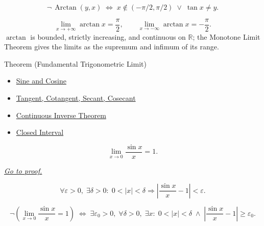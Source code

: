 \begin{remark*}
\[
  \neg\,\operatorname{Arctan}(y,x)
  \;\iff\;
  x\notin(-\pi/2,\pi/2) \;\vee\; \tan x \neq y.
\]
\end{remark*}

\begin{remark*}
\[
  \lim_{x \to +\infty} \arctan x = \frac{\pi}{2},
  \qquad
  \lim_{x \to -\infty} \arctan x = -\frac{\pi}{2}.
\]
$\arctan$ is bounded, strictly increasing, and continuous on
$\mathbb{R}$; the Monotone Limit Theorem gives the limits as the
supremum and infimum of its range.
\end{remark*}


\begin{theorembox}{Theorem (Fundamental Trigonometric Limit)}

\begin{dependencies}
\begin{itemize}
  \item \hyperref[def:sine-cosine]{Sine and Cosine}
  \item \hyperref[def:other-trig]{Tangent, Cotangent, Secant, Cosecant}
  \item \hyperref[thm:continuous-inverse-theorem]{Continuous Inverse Theorem}
  \item \hyperref[def:closed-interval]{Closed Interval}
\end{itemize}
\end{dependencies}
\begin{theorem}
\label{thm:fundamental-trig-limit}
\[
  \lim_{x \to 0} \frac{\sin x}{x} = 1.
\]

\smallskip\noindent
\hyperref[prf:fundamental-trig-limit]{\textit{Go to proof.}}
\end{theorem}
\end{theorembox}\begin{remark*}
\[
  \forall\varepsilon > 0,\;
  \exists\delta > 0 :\;
  0 < |x| < \delta \Rightarrow
  \left|\frac{\sin x}{x} - 1\right| < \varepsilon.
\]
\end{remark*}

\begin{remark*}
\[
  \neg\left(\lim_{x\to 0}\frac{\sin x}{x}=1\right)
  \;\iff\;
  \exists\varepsilon_0>0,\;\forall\delta>0,\;\exists x:\;
  0<|x|<\delta \;\wedge\;
  \left|\frac{\sin x}{x}-1\right|\geq\varepsilon_0.
\]
\end{remark*}

